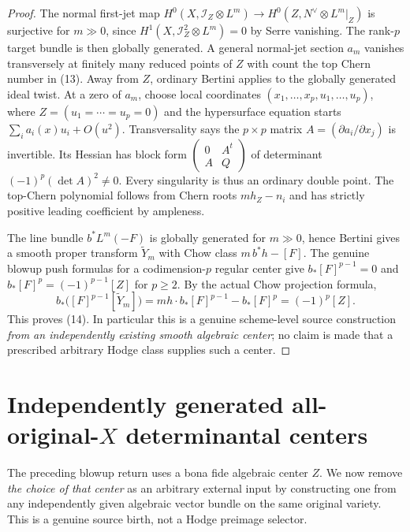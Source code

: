 \documentclass[11pt]{article}
\begin{document}
\begin{proof}
The normal first-jet map
$H^0(X,\mathcal I_Z\otimes L^m)\to
 H^0(Z,N^\vee\otimes L^m|_Z)$ is surjective for
$m\gg0$, since $H^1(X,\mathcal I_Z^2\otimes L^m)=0$
by Serre vanishing. The rank-$p$ target bundle
is then globally generated. A general normal-jet
section $a_m$ vanishes transversely at finitely many
reduced points of $Z$ with count the top Chern number
in (13). Away from $Z$, ordinary Bertini applies to
the globally generated ideal twist. At a zero of
$a_m$, choose local coordinates
$(x_1,\ldots,x_p,u_1,\ldots,u_p)$, where
$Z=(u_1=\cdots=u_p=0)$ and the hypersurface equation
starts $\sum_i a_i(x)u_i+O(u^2)$.
Transversality says the $p\times p$ matrix
$A=(\partial a_i/\partial x_j)$ is invertible.
Its Hessian has block form
$\left(\begin{smallmatrix}0&A^t\\A&Q\end{smallmatrix}\right)$
of determinant $(-1)^p(\det A)^2\ne0$. Every
singularity is thus an ordinary double point.
The top-Chern polynomial follows from Chern roots
$mh_Z-n_i$ and has strictly positive leading
coefficient by ampleness.

The line bundle $b^*L^m(-F)$ is globally generated
for $m\gg0$, hence Bertini gives a smooth proper
transform $\widetilde Y_m$ with Chow class
$m\,b^*h-[F]$. The genuine blowup push formulas for
a codimension-$p$ regular center give
$b_*[F]^{p-1}=0$ and
$b_*[F]^p=(-1)^{p-1}[Z]$ for $p\ge2$.
By the actual Chow projection formula,
\[
 b_*\bigl([F]^{p-1}[\widetilde Y_m]\bigr)
 =m h\cdot b_*[F]^{p-1}-b_*[F]^p
 =(-1)^p[Z].
\]
This proves (14). In particular this is a genuine
scheme-level source construction \emph{from an
independently existing smooth algebraic center};
no claim is made that a prescribed arbitrary
Hodge class supplies such a center.
\end{proof}

\section{Independently generated all-original-$X$ determinantal centers}
The preceding blowup return uses a bona fide algebraic center $Z$.
We now remove \emph{the choice of that center} as an arbitrary
external input by constructing one from any independently given
algebraic vector bundle on the same original variety.
This is a genuine source birth, not a Hodge preimage selector.
\end{document}
